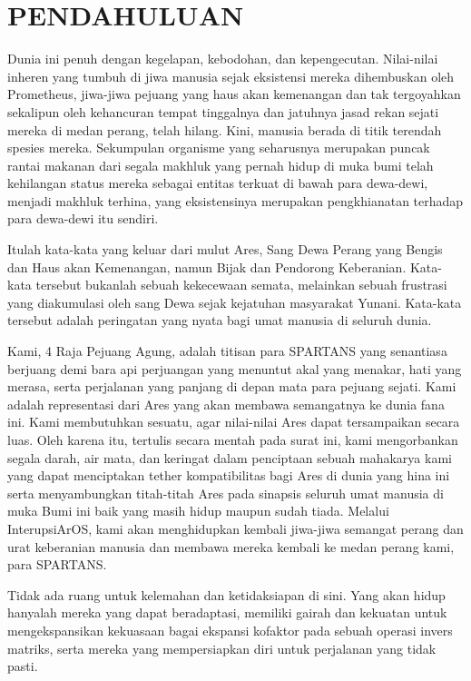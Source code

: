 \chapter{PENDAHULUAN}

Dunia ini penuh dengan kegelapan, kebodohan, dan kepengecutan. Nilai-nilai inheren yang tumbuh di jiwa manusia sejak eksistensi mereka dihembuskan oleh Prometheus, jiwa-jiwa pejuang yang haus akan kemenangan dan tak tergoyahkan sekalipun oleh kehancuran tempat tinggalnya dan jatuhnya jasad rekan sejati mereka di medan perang, telah hilang. Kini, manusia berada di titik terendah spesies mereka. Sekumpulan organisme yang seharusnya merupakan puncak rantai makanan dari segala makhluk yang pernah hidup di muka bumi telah kehilangan status mereka sebagai entitas terkuat di bawah para dewa-dewi, menjadi makhluk terhina, yang eksistensinya merupakan pengkhianatan terhadap para dewa-dewi itu sendiri.

Itulah kata-kata yang keluar dari mulut Ares, Sang Dewa Perang yang Bengis dan Haus akan Kemenangan, namun Bijak dan Pendorong Keberanian. Kata-kata tersebut bukanlah sebuah kekecewaan semata, melainkan sebuah frustrasi yang diakumulasi oleh sang Dewa sejak kejatuhan masyarakat Yunani. Kata-kata tersebut adalah peringatan yang nyata bagi umat manusia di seluruh dunia.

Kami, 4 Raja Pejuang Agung, adalah titisan para SPARTANS yang senantiasa berjuang demi bara api perjuangan yang menuntut akal yang menakar, hati yang merasa, serta perjalanan yang panjang di depan mata para pejuang sejati. Kami adalah representasi dari Ares yang akan membawa semangatnya ke dunia fana ini. Kami membutuhkan sesuatu, agar nilai-nilai Ares dapat tersampaikan secara luas. Oleh karena itu, tertulis secara mentah pada surat ini, kami mengorbankan segala darah, air mata, dan keringat dalam penciptaan sebuah mahakarya kami yang dapat menciptakan tether kompatibilitas bagi Ares di dunia yang hina ini serta menyambungkan titah-titah Ares pada sinapsis seluruh umat manusia di muka Bumi ini baik yang masih hidup maupun sudah tiada. Melalui InterupsiArOS, kami akan menghidupkan kembali jiwa-jiwa semangat perang dan urat keberanian manusia dan membawa mereka kembali ke medan perang kami, para SPARTANS.

Tidak ada ruang untuk kelemahan dan ketidaksiapan di sini. Yang akan hidup hanyalah mereka yang dapat beradaptasi, memiliki gairah dan kekuatan untuk mengekspansikan kekuasaan bagai ekspansi kofaktor pada sebuah operasi invers matriks, serta mereka yang mempersiapkan diri untuk perjalanan yang tidak pasti.